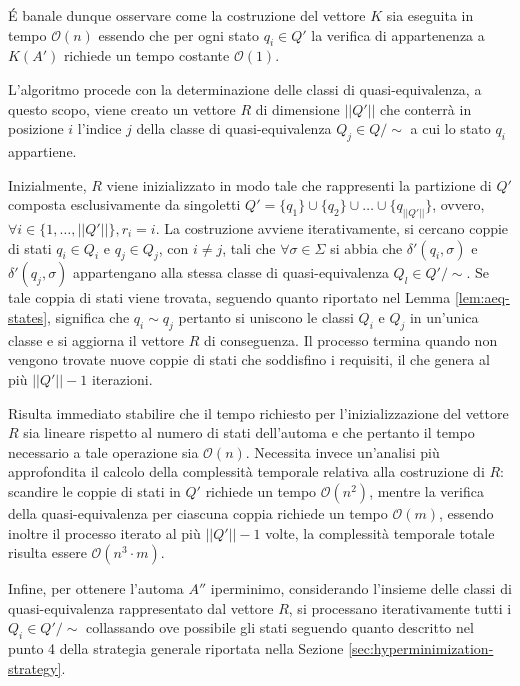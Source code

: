 \documentclass[a4paper,12pt]{report} %
\newcommand{\partitioned}[2]{#1\slash\!\!#2}  %
\newcommand{\bigo}[0]{\mathcal{O}}            %
\begin{document}
É banale dunque osservare come la costruzione del vettore $K$ sia eseguita in tempo $\bigo(n)$ essendo che 
per ogni stato $q_i \in Q'$ la verifica di appartenenza a $K(A')$ richiede un tempo costante $\bigo(1)$.

L'algoritmo procede con la determinazione delle classi di quasi-equivalenza, a questo scopo, viene creato un vettore
$R$ di dimensione $||Q'||$ che conterrà in posizione $i$ l'indice $j$ della classe di quasi-equivalenza 
$Q_j \in \partitioned{Q}{\sim}$ a cui lo stato $q_i$ appartiene. 

Inizialmente, $R$ viene inizializzato in modo tale che rappresenti la partizione di $Q'$ composta esclusivamente
da singoletti $Q' = \{ q_1 \} \cup \{ q_2 \} \cup \dots \cup \{ q_{||Q'||} \}$, ovvero, 
$\forall i \in \{ 1, \dots, ||Q'|| \}, r_i = i$. 
La costruzione avviene iterativamente, si cercano coppie di stati $q_i \in Q_i$ e $q_j \in Q_j$,
con $i \neq j$, tali che $\forall \sigma \in \Sigma$ si abbia
che $\delta'(q_i, \sigma)$ e $\delta'(q_j, \sigma)$ appartengano alla stessa classe di
quasi-equivalenza $Q_l \in \partitioned{Q'}{\sim}$.
Se tale coppia di stati viene trovata, seguendo quanto riportato nel Lemma \ref{lem:aeq-states},
significa che $q_i \sim q_j$ pertanto si uniscono le classi $Q_i$ e $Q_j$ in un'unica classe e si
aggiorna il vettore $R$ di conseguenza. Il processo termina quando non vengono trovate nuove coppie
di stati che soddisfino i requisiti, il che genera al più $||Q'|| - 1$ iterazioni.

Risulta immediato stabilire che il tempo richiesto per l'inizializzazione del vettore $R$ sia lineare rispetto
al numero di stati dell'automa e che pertanto il tempo necessario a tale operazione sia $\bigo(n)$.
Necessita invece un'analisi più approfondita il calcolo della complessità temporale relativa
alla costruzione di $R$: scandire le coppie di stati in $Q'$ richiede un tempo $\bigo(n^2)$, mentre la verifica
della quasi-equivalenza per ciascuna coppia richiede un tempo $\bigo(m)$, essendo inoltre il processo iterato
al più $||Q'|| - 1$ volte, la complessità temporale totale risulta essere $\bigo(n^3 \cdot m)$.

Infine, per ottenere l'automa $A''$ iperminimo, considerando l'insieme delle classi di quasi-equivalenza
rappresentato dal vettore $R$, si processano iterativamente tutti i $Q_i \in \partitioned{Q'}{\sim}$
collassando ove possibile gli stati seguendo quanto descritto nel punto 4 della strategia generale riportata
nella Sezione \ref{sec:hyperminimization-strategy}.
\end{document}
